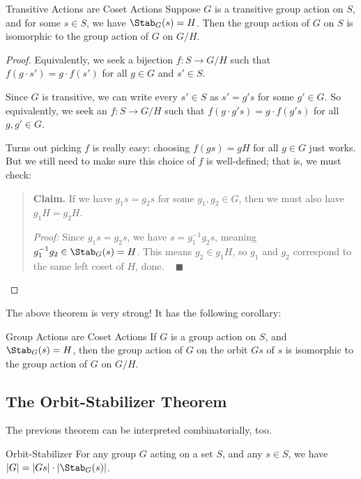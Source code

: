 \begin{theorem}{Transitive Actions are Coset Actions}
    Suppose $G$ is a transitive group action on $S$, and for some $s \in S$, we have $\Stab_G(s) = H$.  Then the group action of $G$ on $S$ is isomorphic to the group action of $G$ on $G / H$.
\end{theorem}

\begin{proof}
    Equivalently, we seek a bijection $f: S \to G/H$ such that $f(g \cdot s') = g \cdot f(s')$ for all $g \in G$ and $s' \in S$.

    Since $G$ is transitive, we can write every $s' \in S$ as $s' = g' s$ for some $g' \in G$.  So equivalently, we seek an $f: S \to G / H$ such that $f(g \cdot g's) = g \cdot f(g's)$ for all $g, g' \in G$.

    Turns out picking $f$ is really easy: choosing $f(gs) = gH$ for all $g \in G$ just works.  But we still need to make sure this choice of $f$ is well-defined; that is, we must check:
    \begin{quote}
        \textbf{Claim.} If we have $g_1s = g_2s$ for some $g_1, g_2 \in G$, then we must also have $g_1 H = g_2 H$.

        \emph{Proof:} Since $g_1s = g_2s$, we have $s = g_1^{-1}g_2s$, meaning $g_1^{-1}g_2 \in \Stab_G(s) = H$.  This means $g_2 \in g_1H$, so $g_1$ and $g_2$ correspond to the same left coset of $H$, done. ~ $\blacksquare$
    \end{quote}
\end{proof}

The above theorem is very strong! It has the following corollary:

\begin{theorem}{Group Actions are Coset Actions}
If $G$ is a group action on $S$, and $\Stab_G(s) = H$, then the group action of $G$ on the orbit $Gs$ of $s$ is isomorphic to the group action of $G$ on $G/H$.
\end{theorem}

\subsection{The Orbit-Stabilizer Theorem}

The previous theorem can be interpreted combinatorially, too.

\begin{theorem}{Orbit-Stabilizer}
    For any group $G$ acting on a set $S$, and any $s \in S$, we have $|G| = |Gs| \cdot |\Stab_G(s)|$.
\end{theorem}

